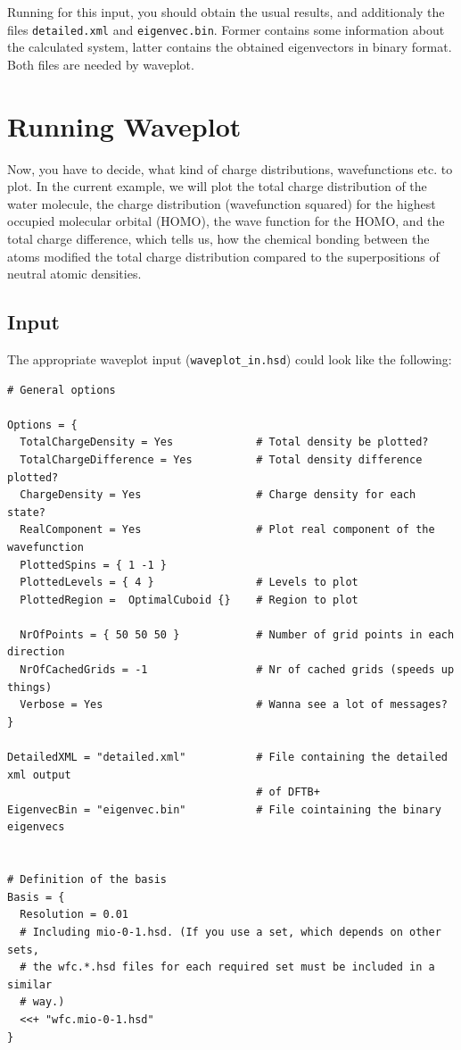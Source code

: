 Running \dftbp{} for this input, you should obtain the usual results,
and additionaly the files \verb|detailed.xml| and
\verb|eigenvec.bin|. Former contains some information about the
calculated system, latter contains the obtained eigenvectors in binary
format. Both files are needed by waveplot.


\section{Running Waveplot}

Now, you have to decide, what kind of charge distributions, wavefunctions etc.
to plot. In the current example, we will plot the total charge distribution of
the water molecule, the charge distribution (wavefunction squared) for the
highest occupied molecular orbital (HOMO), the wave function for the HOMO, and
the total charge difference, which tells us, how the chemical bonding between
the atoms modified the total charge distribution compared to the superpositions
of neutral atomic densities.

\subsection{Input}

The appropriate waveplot input (\verb|waveplot_in.hsd|) could look
like the following:

\begin{verbatim}
# General options

Options = {
  TotalChargeDensity = Yes             # Total density be plotted?
  TotalChargeDifference = Yes          # Total density difference plotted?
  ChargeDensity = Yes                  # Charge density for each state?
  RealComponent = Yes                  # Plot real component of the wavefunction
  PlottedSpins = { 1 -1 }
  PlottedLevels = { 4 }                # Levels to plot
  PlottedRegion =  OptimalCuboid {}    # Region to plot

  NrOfPoints = { 50 50 50 }            # Number of grid points in each direction
  NrOfCachedGrids = -1                 # Nr of cached grids (speeds up things)
  Verbose = Yes                        # Wanna see a lot of messages?
}

DetailedXML = "detailed.xml"           # File containing the detailed xml output
                                       # of DFTB+
EigenvecBin = "eigenvec.bin"           # File cointaining the binary eigenvecs


# Definition of the basis
Basis = {
  Resolution = 0.01
  # Including mio-0-1.hsd. (If you use a set, which depends on other sets,
  # the wfc.*.hsd files for each required set must be included in a similar
  # way.)
  <<+ "wfc.mio-0-1.hsd"  
}
\end{verbatim}

